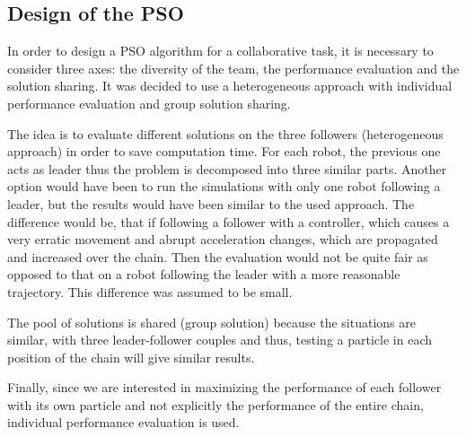 \documentclass[a4paper, 10pt, conference]{ieeeconf}      %
\begin{document}
\subsection{Design of the PSO}
In order to design a PSO algorithm for a collaborative task, it is necessary to consider three axes: the diversity of the team, the performance evaluation and the solution sharing. It was decided  to use a heterogeneous approach with individual performance evaluation and group solution sharing. 

The idea is to evaluate different solutions on the three followers (heterogeneous approach) in order to save computation time. For each robot, the previous one acts as leader thus the problem is decomposed into three similar parts. Another option would have been to run the simulations with only one robot following a leader, but the results would have been similar to the used approach. The difference would be, that if following a follower with a controller, which causes a very erratic movement and abrupt acceleration changes, which are propagated and increased over the chain. Then the evaluation would not be quite fair as opposed to that on a robot following the leader with a more reasonable trajectory. This difference was assumed to be small.

The pool of solutions is shared (group solution) because the situations are similar, with three leader-follower couples and thus, testing a particle in each position of the chain will give similar results.

Finally, since we are interested in maximizing the performance of each follower with its own particle and not explicitly the performance of the entire chain, individual performance evaluation is used.
\end{document}

